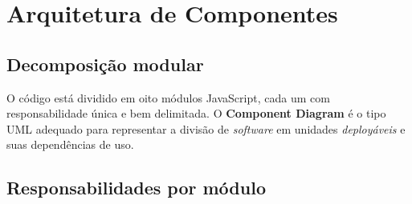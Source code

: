 \chapter{Arquitetura de Componentes}

\section{Decomposição modular}

O código está dividido em oito módulos JavaScript, cada um com responsabilidade única e
bem delimitada. O \textbf{Component Diagram} é o tipo UML adequado para representar a
divisão de \emph{software} em unidades \emph{deployáveis} e suas dependências de uso.


\section{Responsabilidades por módulo}

